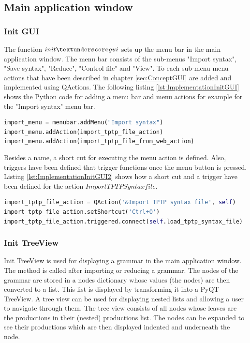 \subsection{Main application window}\label{sec:ImplementationGUIMainAppli}

\subsubsection{Init GUI}\label{sec:ImplementationGUIInit}

The function $init\textunderscore gui$ sets up the menu bar in the main application window. The menu bar consists of the sub-menus "Import syntax", "Save syntax", "Reduce", "Control file" and "View". To each sub-menu menu actions that have been described in chapter \ref{sec:ConceptGUI} are added and implemented using QActions. The following listing \ref{lst:ImplementationInitGUI} shows the Python code for adding a menu bar and menu actions for example for the "Import syntax" menu bar.

\begin{lstlisting}[language=Python, basicstyle=\scriptsize	,caption= Implementation of menu bar,label= lst:ImplementationInitGUI]
import_menu = menubar.addMenu("Import syntax")
import_menu.addAction(import_tptp_file_action)
import_menu.addAction(import_tptp_file_from_web_action)
\end{lstlisting}

Besides a name, a short cut for executing the menu action is defined. Also, triggers have been defined that trigger functions once the menu button is pressed. Listing \ref{lst:ImplementationInitGUI2} shows how a short cut and a trigger have been defined for the action $Import TPTP Syntax file$.

\begin{lstlisting}[language=Python, basicstyle=\scriptsize	,caption= Implementation of menu actions,label= lst:ImplementationInitGUI2]
import_tptp_file_action = QAction('&Import TPTP syntax file', self)
import_tptp_file_action.setShortcut('Ctrl+O')
import_tptp_file_action.triggered.connect(self.load_tptp_syntax_file)
\end{lstlisting}


\subsubsection{Init TreeView}\label{sec:ImplementationGUIInitTreeView}
Init TreeView is used for displaying a grammar in the main application window. The method is called after importing or reducing a grammar. The nodes of the grammar are stored in a nodes dictionary whose values (the nodes) are then converted to a list. This list is displayed by transforming it into a PyQT TreeView. A tree view can be used for displaying nested lists and allowing a user to navigate through them. The tree view consists of all nodes whose leaves are the productions in their (nested) productions list. The nodes can be expanded to see their productions which are then displayed indented and underneath the node.

